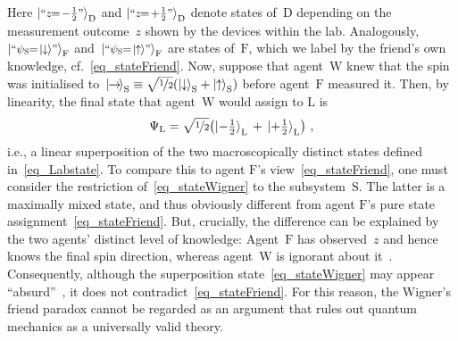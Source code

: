 \documentclass[12pt]{article}
\theoremstyle{mystyle}
\theoremstyle{definition}
\newcommand*{\ket}[1]{{| #1 \rangle}}
\newcommand*{\Friend}{\mathrm{F}}
\newcommand*{\Lab}{\mathrm{L}}
\newcommand*{\Wigner}{\mathrm{W}}
\newcommand*{\Spin}{\mathrm{S}}
\newcommand*{\spinup}{\ket{{\hspace{-0.1ex}\uparrow\hspace{-0.1ex}}}}
\newcommand*{\spindown}{\ket{{\hspace{-0.1ex}\downarrow\hspace{-0.1ex}}}}
\newcommand*{\spinright}{\ket{{\hspace{-0.2ex}\rightarrow\hspace{-0.4ex}}}}
\newcommand*{\sminus}{{\textstyle - \frac{1}{2}}}
\newcommand*{\splus}{{\textstyle + \frac{1}{2}}}
\begin{document}
Here $\ket{\text{\footnotesize ``$z \!\! = \! \sminus$''}}_{\mathrm{D}}$ and $\ket{\text{\footnotesize ``$z \!\! = \! \splus$''}}_{\mathrm{D}}$ denote states of~$\mathrm{D}$ depending on the measurement outcome~$z$ shown by the devices within the lab.  Analogously, $\ket{\text{\footnotesize ``$\psi_{\Spin} \!\! = \! \spindown$''}}_{\mathrm{F}}$ and~$\ket{\text{\footnotesize ``$\psi_{\Spin} \!\!= \! \spinup$''}}_{\mathrm{F}}$ are states of~$\Friend$, which we label by the friend's own knowledge, cf.~\eqref{eq_stateFriend}. Now, suppose that agent~$\Wigner$ knew that the spin was initialised to~$\spinright_{\Spin} \equiv \smash{\sqrt{\nicefrac{1}{2}}(\spindown_{\Spin} + \spinup_{\Spin})}$ before agent~$\Friend$ measured it. Then, by linearity, the final state that agent~$\Wigner$ would assign to $\Lab$ is 
\begin{align} \label{eq_stateWigner}
   \Psi_{\Lab} = \sqrt{\nicefrac{1}{2}} \bigl( \ket{\sminus}_{\Lab} \, + \,  \ket{\splus}_{\Lab}  \bigr) \ ,
 \end{align}
 i.e., a linear superposition of the two macroscopically distinct  states defined in~\eqref{eq_Labstate}. To compare this to agent $\Friend$'s view~\eqref{eq_stateFriend}, one must consider the restriction of~\eqref{eq_stateWigner} to the subsystem~$\Spin$. The latter is a maximally mixed state, and thus  obviously different from agent $\Friend$'s pure state assignment~\eqref{eq_stateFriend}. But, crucially, the difference can be explained by the two agents' distinct level of knowledge: Agent~$\Friend$ has observed~$z$ and hence knows the final spin direction, whereas agent~$\Wigner$ is ignorant about it~\cite{Fuchs10}.   Consequently, although the superposition state~\eqref{eq_stateWigner} may appear ``absurd''~\cite{Wigner67}, it does not contradict~\eqref{eq_stateFriend}. For this reason, the Wigner's friend paradox cannot be regarded as an argument that rules out quantum mechanics as a universally valid theory.
 
 
\end{document}
